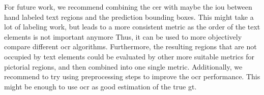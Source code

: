 For future work, we recommend combining the \gls{cer} with maybe the \gls{iou} between hand labeled text regions and the prediction bounding boxes.
This might take a lot of labeling work, but leads to a more consistent metric as the order of the text elements is not important anymore
Thus, it can be used to more objectively compare different \gls{ocr} algorithms.
Furthermore, the resulting regions that are not occupied by text elements could be evaluated by other more suitable metrics for pictorial regions, and then combined into one single metric.
Additionally, we recommend to try using preprocessing steps to improve the \gls{ocr} performance.
This might be enough to use \gls{ocr} as good estimation of the true \gls{gt}.
